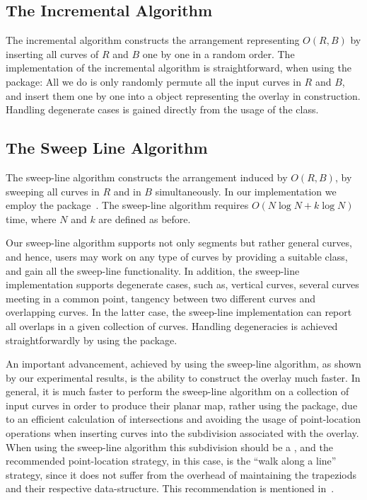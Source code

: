 \subsection*{The Incremental Algorithm}
\label{sec:MapOverlayIncremental}
The incremental algorithm constructs the arrangement representing 
$O(R,B)$ by inserting all curves of $R$ and $B$ one by one in a 
random order. 
The implementation of the incremental algorithm is straightforward, 
when using the  package: All we 
do is only randomly permute all the input curves in $R$ and $B$, 
and insert them one by one into a 
 object representing the 
overlay in construction.
Handling degenerate cases is gained directly from the usage of the 
 class.

\subsection*{The Sweep Line Algorithm}
\label{sec:MapOverlaySweepLine}
The sweep-line algorithm constructs the arrangement induced by $O(R,B)$, 
by sweeping all curves in $R$ and in $B$ simultaneously. 
In our implementation we employ the  
package~. 
The sweep-line algorithm requires $O(N\log{N} + k\log{N})$ time,
where $N$ and $k$ are defined as before.

Our sweep-line algorithm supports not only segments but rather 
general curves, and hence, users may work on any type of curves by 
providing a suitable  class, and 
gain all the sweep-line functionality.
In addition, the sweep-line implementation supports degenerate cases, 
such as, vertical curves, several curves meeting in a common point, 
tangency between two different curves and overlapping curves.
In the latter case, the sweep-line implementation can report all overlaps
in a given collection of curves.
Handling degeneracies is achieved straightforwardly by using the 
 package.

An important advancement, achieved by using the sweep-line algorithm, 
as shown by our experimental results,
is the ability to construct the overlay much faster.
In general, it is much faster to perform the sweep-line algorithm on
a collection of input curves in order to produce their planar map,
rather using the  package,
due to an efficient calculation of intersections and avoiding the usage of
point-location operations when inserting curves into the subdivision 
associated with the overlay. When using the sweep-line algorithm this 
subdivision should be a , and the recommended 
point-location strategy, in this case, is the ``walk along a line'' 
strategy, since it does not suffer from the overhead of maintaining 
the trapeziods and their respective data-structure.
This recommendation is mentioned in~.

